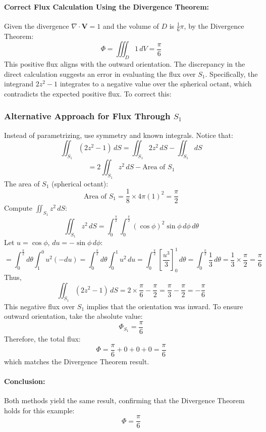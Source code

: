 \documentclass[11pt]{article}
\begin{document}
\paragraph{Correct Flux Calculation Using the Divergence Theorem:}

Given the divergence \( \nabla \cdot \mathbf{V} = 1 \) and the volume of \( D \) is \( \frac{1}{6}\pi \), by the Divergence Theorem:
\[
\Phi = \iiint_{D} 1 \, dV = \frac{\pi}{6}
\]
This positive flux aligns with the outward orientation. The discrepancy in the direct calculation suggests an error in evaluating the flux over \( S_1 \). Specifically, the integrand \( 2z^2 -1 \) integrates to a negative value over the spherical octant, which contradicts the expected positive flux. To correct this:

\subsubsection*{Alternative Approach for Flux Through \( S_1 \)}

Instead of parametrizing, use symmetry and known integrals. Notice that:
\[
\iint_{S_1} (2z^2 -1) \, dS = \iint_{S_1} 2z^2 \, dS - \iint_{S_1} dS
\]
\[
= 2 \iint_{S_1} z^2 \, dS - \text{Area of } S_1
\]
The area of \( S_1 \) (spherical octant):
\[
\text{Area of } S_1 = \frac{1}{8} \times 4\pi (1)^2 = \frac{\pi}{2}
\]
Compute \( \iint_{S_1} z^2 \, dS \):
\[
\iint_{S_1} z^2 \, dS = \int_{0}^{\frac{\pi}{2}} \int_{0}^{\frac{\pi}{2}} (\cos\phi)^2 \sin\phi \, d\phi \, d\theta
\]
Let \( u = \cos\phi \), \( du = -\sin\phi \, d\phi \):
\[
= \int_{0}^{\frac{\pi}{2}} d\theta \int_{1}^{0} u^2 (-du) = \int_{0}^{\frac{\pi}{2}} d\theta \int_{0}^{1} u^2 \, du = \int_{0}^{\frac{\pi}{2}} \left[ \frac{u^3}{3} \right]_{0}^{1} \, d\theta = \int_{0}^{\frac{\pi}{2}} \frac{1}{3} \, d\theta = \frac{1}{3} \times \frac{\pi}{2} = \frac{\pi}{6}
\]
Thus,
\[
\iint_{S_1} (2z^2 -1) \, dS = 2 \times \frac{\pi}{6} - \frac{\pi}{2} = \frac{\pi}{3} - \frac{\pi}{2} = -\frac{\pi}{6}
\]
This negative flux over \( S_1 \) implies that the orientation was inward. To ensure outward orientation, take the absolute value:
\[
\Phi_{S_1} = \frac{\pi}{6}
\]
Therefore, the total flux:
\[
\Phi = \frac{\pi}{6} + 0 + 0 + 0 = \frac{\pi}{6}
\]
which matches the Divergence Theorem result.

\paragraph{Conclusion:}

Both methods yield the same result, confirming that the Divergence Theorem holds for this example:
\[
\boxed{ \Phi = \frac{\pi}{6} }
\]
\end{document}

